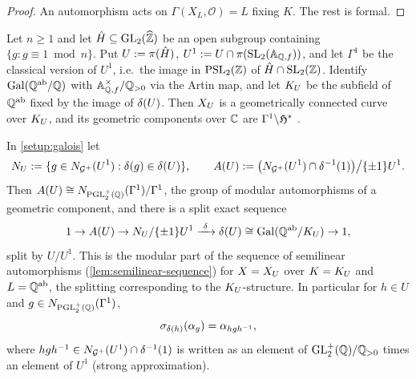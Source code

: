 \begin{proof}
An automorphism acts on $\Gamma(X_L, \mathcal{O}) = L$ fixing $K$. The rest
is formal.
\end{proof}

\begin{setup}\label{setup:galois}
Let $n \geq 1$ and let $\hat H \subseteq \GL{2}{\ProfiniteIntegers}$ be an open
subgroup containing $\{g : g \equiv 1 \bmod n\}$. Put
$U := \pi(\hat H)$, $U^{1} := U \cap
\AdelicProjection(\SL{2}{\FiniteAdeles{\QQ}})$, and let $\Gamma^{1}$ be the
classical version of $U^{1}$, i.e.\ the image in $\PSL{2}{\ZZ}$ of
$\hat H\cap\SL{2}{\ZZ}$. Identify $\operatorname{Gal}(\mathbb{Q}^{\mathrm{ab}}/\mathbb{Q})$ with
$\mathbb{A}_{\mathbb{Q},f}^{\times}/\mathbb{Q}_{>0}$ via the Artin map, and let
$K_{U}$ be the subfield of $\mathbb{Q}^{\mathrm{ab}}$ fixed by the image of
$\delta(U)$. Then $X_{U}$ is a geometrically connected curve over
$K_{U}$, and its geometric components over $\mathbb{C}$ are
$\Gamma^{1}\backslash\mathfrak{H}^{*}$ \cite{DeligneRapoport1973}.
\end{setup}

\begin{proposition}\label{prop:galois-action}
In \cref{setup:galois} let
\[
  N_U := \{g \in N_{\mathcal{G}^{+}}(U^{1}) : \delta(g) \in \delta(U)\},
  \qquad
  A(U) := \bigl(N_{\mathcal{G}^{+}}(U^{1})\cap\delta^{-1}(1)\bigr)
  \big/ \{\pm 1\}U^{1}.
\]
Then $A(U) \cong N_{\mathrm{PGL}_{2}^{+}(\mathbb{Q})}(\Gamma^{1})/\Gamma^{1}$,
the group of modular automorphisms of a geometric component, and there is
a split exact sequence
\[
  1 \to A(U) \to N_U/\{\pm 1\}U^{1}
  \xrightarrow{\ \delta\ } \delta(U) \cong \operatorname{Gal}(\mathbb{Q}^{\mathrm{ab}}/K_{U}) \to 1,
\]
split by $U/U^{1}$. This is the modular part of the sequence of
semilinear automorphisms (\cref{lem:semilinear-sequence}) for
$X = X_{U}$ over $K = K_{U}$ and $L = \mathbb{Q}^{\mathrm{ab}}$, the
splitting corresponding to the $K_{U}$-structure. In particular
for $h \in U$ and $g \in N_{\mathrm{PGL}_{2}^{+}(\mathbb{Q})}(\Gamma^{1})$,
\[
  \sigma_{\delta(h)}(\alpha_{g}) = \alpha_{hgh^{-1}},
\]
where $hgh^{-1} \in N_{\mathcal{G}^{+}}(U^{1})\cap\delta^{-1}(1)$ is
written as an element of $\mathrm{GL}_{2}^{+}(\mathbb{Q})/\mathbb{Q}_{>0}$ times an element of $U^{1}$
(strong approximation).
\end{proposition}

